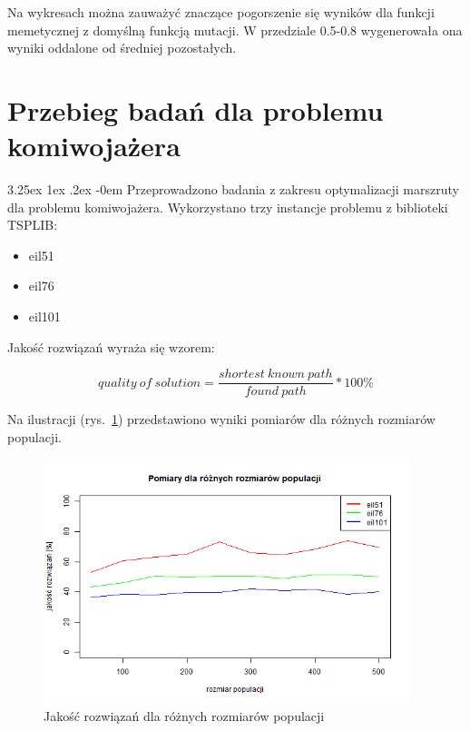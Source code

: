 \documentclass[11pt, a4paper]{article}
\makeatletter
\newcommand{\fbi}{\leavevmode{\parindent=1em\indent}}
\renewcommand\paragraph{\@startsection{paragraph}{5}{\z@}
  {3.25ex \@plus1ex \@minus.2ex}
  {-0em}
  {\normalfont\normalsize\bfseries}}
\makeatother
\begin{document}
\fbi
Na wykresach można zauważyć znaczące pogorszenie się wyników dla funkcji memetycznej z domyślną funkcją mutacji. W przedziale 0.5-0.8 wygenerowała ona wyniki oddalone od średniej pozostałych.


\newpage
\section{Przebieg badań dla problemu komiwojażera}
\paragraph{}
Przeprowadzono badania z zakresu optymalizacji marszruty dla problemu komiwojażera. Wykorzystano trzy instancje problemu z biblioteki TSPLIB:

\begin{itemize}
	\item eil51
	\item eil76
	\item eil101
\end{itemize}

\fbi
Jakość rozwiązań wyraża się wzorem:

\begin{equation}\label{eq:tspquality}
quality\ of\ solution = \frac{shortest\ known \ path}{found\ path} * 100\%
\end{equation}

\fbi
Na ilustracji (rys.~\ref{fig:tsppop}) przedstawiono wyniki pomiarów dla różnych rozmiarów populacji.

\begin{figure}[H]
	\centering
	\includegraphics[width=0.95\textwidth]{./assets/tsp_pop.png}
	\caption{Jakość rozwiązań dla różnych rozmiarów populacji}
	\label{fig:tsppop}
\end{figure}
\end{document}
